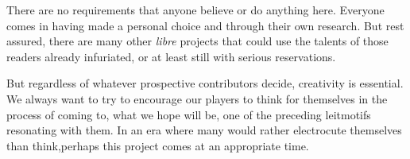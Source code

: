 There are no requirements that anyone believe or do anything here. Everyone comes in having made a personal choice and through their own research. But rest assured, there are many other {\it libre} projects that could use the talents of those readers already infuriated, or at least still with serious reservations.

But regardless of whatever prospective contributors decide, creativity is essential. We always want to try to encourage our players to think for themselves in the process of coming to, what we hope will be, one of the preceding leitmotifs resonating with them. In an era where many would rather electrocute themselves than think, perhaps this project comes at an appropriate time.

\StopChapter

